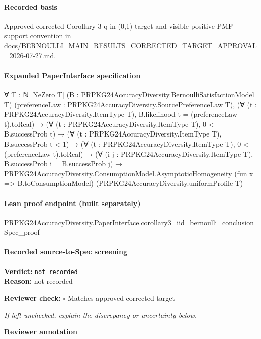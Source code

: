 \documentclass[10pt]{article}
\newcommand{\reviewerbox}{%
  \par\noindent\fbox{\parbox{0.96\linewidth}{\rule{0pt}{0.38in}}}\par
}
\newcommand{\reviewmatch}[1]{%
  \par\noindent\textbf{Reviewer check:} $\square$\; #1\par
  \noindent\emph{If left unchecked, explain the discrepancy or uncertainty below.}\par
}
\begin{document}
\paragraph{Recorded basis}
Approved corrected Corollary 3 q-\allowbreak{}in-\allowbreak{}(0,1) target and visible positive-\allowbreak{}PMF-\allowbreak{}support convention in docs/\allowbreak{}BERNOULLI\_\allowbreak{}MAIN\_\allowbreak{}RESULTS\_\allowbreak{}CORRECTED\_\allowbreak{}TARGET\_\allowbreak{}APPROVAL\_\allowbreak{}2026-\allowbreak{}07-\allowbreak{}27.\allowbreak{}md.\allowbreak{}
\paragraph{Expanded PaperInterface specification}
\begin{ReviewVerbatim}
∀ {T : ℕ} [NeZero T] (B : PRPKG24AccuracyDiversity.BernoulliSatisfactionModel T)
  (preferenceLaw : PRPKG24AccuracyDiversity.SourcePreferenceLaw T),
  (∀ (t : PRPKG24AccuracyDiversity.ItemType T), B.likelihood t = (preferenceLaw t).toReal) →
    (∀ (t : PRPKG24AccuracyDiversity.ItemType T), 0 < B.successProb t) →
      (∀ (t : PRPKG24AccuracyDiversity.ItemType T), B.successProb t < 1) →
        (∀ (t : PRPKG24AccuracyDiversity.ItemType T), 0 < (preferenceLaw t).toReal) →
          (∀ (i j : PRPKG24AccuracyDiversity.ItemType T), B.successProb i = B.successProb j) →
            PRPKG24AccuracyDiversity.ConsumptionModel.AsymptoticHomogeneity (fun x => B.toConsumptionModel)
              (PRPKG24AccuracyDiversity.uniformProfile T)
\end{ReviewVerbatim}

\paragraph{Lean proof endpoint (built separately)}\begin{ReviewVerbatim}
PRPKG24AccuracyDiversity.PaperInterface.corollary3_iid_bernoulli_conclusionSpec_proof
\end{ReviewVerbatim}

\paragraph{Recorded source-to-Spec screening}
\textbf{Verdict:} \texttt{not recorded}
\\
\textbf{Reason:} not recorded
\reviewmatch{Matches approved corrected target}
\noindent\textbf{Reviewer annotation}\par
\reviewerbox
\clearpage
\hypertarget{source-claim-04c6588920268e32}{}
\end{document}
